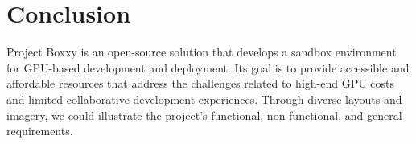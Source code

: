 
\chapter{Conclusion} %

\label{Chapter6} %




Project Boxxy is an open-source solution that develops a sandbox environment for GPU-based development and deployment. Its goal is to provide accessible and affordable resources that address the challenges related to high-end GPU costs and limited collaborative development experiences. Through diverse layouts and imagery, we could illustrate the project's functional, non-functional, and general requirements.

